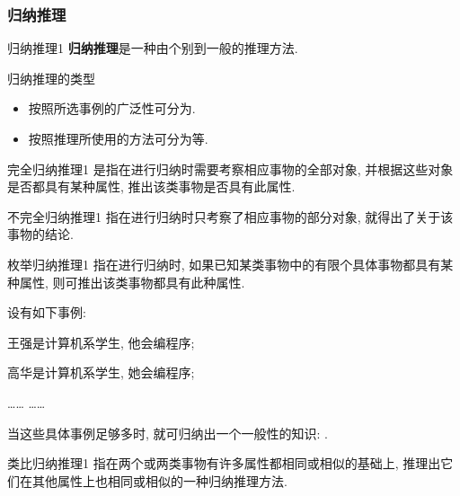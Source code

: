 \subsubsection{归纳推理}
\vspace{0.3cm}
\begin{mydef}{归纳推理}{1}
    \textbf{归纳推理}是一种由个别到一般的推理方法.
\end{mydef}
\begin{example}
归纳推理的类型
\begin{itemize}
    \item 按照所选事例的广泛性可分为.
    \item 按照推理所使用的方法可分为等.
\end{itemize}
\end{example}
\vspace{0.3cm}
\begin{mydef}{完全归纳推理}{1}
    是指在进行归纳时需要考察相应事物的全部对象, 并根据这些对象是否都具有某种属性, 推出该类事物是否具有此属性.
\end{mydef}
\vspace{0.3cm}
\begin{mydef}{不完全归纳推理}{1}
    指在进行归纳时只考察了相应事物的部分对象, 就得出了关于该事物的结论.
\end{mydef}
\vspace{0.3cm}
\begin{mydef}{枚举归纳推理}{1}
    指在进行归纳时, 如果已知某类事物中的有限个具体事物都具有某种属性, 则可推出该类事物都具有此种属性.
\end{mydef}
\begin{example}
设有如下事例:

    王强是计算机系学生, 他会编程序;

    高华是计算机系学生, 她会编程序;

     ……                ……
\end{example}
    当这些具体事例足够多时, 就可归纳出一个一般性的知识: .
\vspace{0.3cm}
\begin{mydef}{类比归纳推理}{1}
指在两个或两类事物有许多属性都相同或相似的基础上, 推理出它们在其他属性上也相同或相似的一种归纳推理方法.
\end{mydef}
